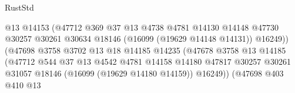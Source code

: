 \begin{lexlean}{RustStd}
\begin{coremodule}
                                              @13
                                              @14153
                                              (@47712
                                                @369
                                                @37
                                                @13
                                                @4738
                                                @4781
                                                @14130
                                                @14148
                                                @47730
                                                @30257
                                                @30261
                                                @30634
                                                @18146
                                                (@16099 (@19629 @14148 @14131))
                                                @16249))
                                            (@47698
                                              @3758
                                              @3702
                                              @13
                                              @18
                                              @14185
                                              @14235
                                              (@47678
                                                @3758
                                                @13
                                                @14185
                                                (@47712
                                                  @544
                                                  @37
                                                  @13
                                                  @4542
                                                  @4781
                                                  @14158
                                                  @14180
                                                  @47817
                                                  @30257
                                                  @30261
                                                  @31057
                                                  @18146
                                                  (@16099 (@19629 @14180 @14159))
                                                  @16249))
                                              (@47698
                                                @403
                                                @410
                                                @13

\end{coremodule}
\end{lexlean}
